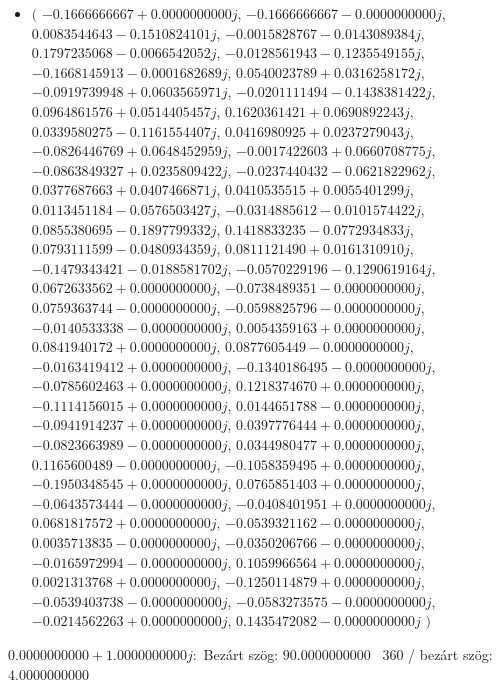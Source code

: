 \documentclass[14pt,a4paper]{article}
\begin{document}
\begin{itemize}
\item
$\big($
$-0.1666666667+0.0000000000j$, $-0.1666666667-0.0000000000j$, $0.0083544643-0.1510824101j$, $-0.0015828767-0.0143089384j$, $0.1797235068-0.0066542052j$, $-0.0128561943-0.1235549155j$, $-0.1668145913-0.0001682689j$, $0.0540023789+0.0316258172j$, $-0.0919739948+0.0603565971j$, $-0.0201111494-0.1438381422j$, $0.0964861576+0.0514405457j$, $0.1620361421+0.0690892243j$, $0.0339580275-0.1161554407j$, $0.0416980925+0.0237279043j$, $-0.0826446769+0.0648452959j$, $-0.0017422603+0.0660708775j$, $-0.0863849327+0.0235809422j$, $-0.0237440432-0.0621822962j$, $0.0377687663+0.0407466871j$, $0.0410535515+0.0055401299j$, $0.0113451184-0.0576503427j$, $-0.0314885612-0.0101574422j$, $0.0855380695-0.1897799332j$, $0.1418833235-0.0772934833j$, $0.0793111599-0.0480934359j$, $0.0811121490+0.0161310910j$, $-0.1479343421-0.0188581702j$, $-0.0570229196-0.1290619164j$, $0.0672633562+0.0000000000j$, $-0.0738489351-0.0000000000j$, $0.0759363744-0.0000000000j$, $-0.0598825796-0.0000000000j$, $-0.0140533338-0.0000000000j$, $0.0054359163+0.0000000000j$, $0.0841940172+0.0000000000j$, $0.0877605449-0.0000000000j$, $-0.0163419412+0.0000000000j$, $-0.1340186495-0.0000000000j$, $-0.0785602463+0.0000000000j$, $0.1218374670+0.0000000000j$, $-0.1114156015+0.0000000000j$, $0.0144651788-0.0000000000j$, $-0.0941914237+0.0000000000j$, $0.0397776444+0.0000000000j$, $-0.0823663989-0.0000000000j$, $0.0344980477+0.0000000000j$, $0.1165600489-0.0000000000j$, $-0.1058359495+0.0000000000j$, $-0.1950348545+0.0000000000j$, $0.0765851403+0.0000000000j$, $-0.0643573444-0.0000000000j$, $-0.0408401951+0.0000000000j$, $0.0681817572+0.0000000000j$, $-0.0539321162-0.0000000000j$, $0.0035713835-0.0000000000j$, $-0.0350206766-0.0000000000j$, $-0.0165972994-0.0000000000j$, $0.1059966564+0.0000000000j$, $0.0021313768+0.0000000000j$, $-0.1250114879+0.0000000000j$, $-0.0539403738-0.0000000000j$, $-0.0583273575-0.0000000000j$, $-0.0214562263+0.0000000000j$, $0.1435472082-0.0000000000j$
$\big)$
\end{itemize}
$0.0000000000+1.0000000000j$:\
Bezárt szög: $90.0000000000$ \
360 / bezárt szög: $4.0000000000$\
\end{document}
